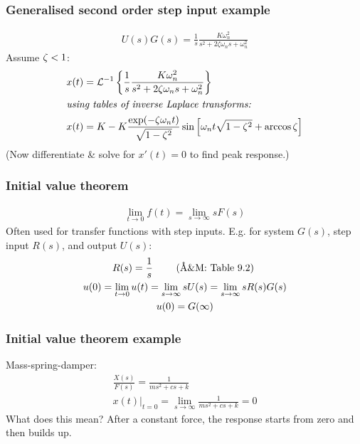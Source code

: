 \documentclass[10pt]{beamer-control}
\begin{document}
\begin{frame}
  \frametitle{Generalised second order step input example}

  \begin{gather}
    U(s) G(s) = \frac{1}{s}\frac{K\omega_n^2}{s^2+2\zeta\omega_ns+\omega_n^2}
  \end{gather}
  Assume $\zeta<1$:
  \begin{align}
    x(t) &= \mathcal{L}^{-1}\left\{ \frac{1}{s}\frac{K\omega_n^2}{s^2+2\zeta\omega_n s+\omega_n^2} \right\} \\
    \intertext{\em using tables of inverse Laplace transforms:}
    x(t) &= K - K\frac{\exp(-\zeta\omega_n t)}{\sqrt{1-\zeta^2}}\sin\left[\omega_n t\sqrt{1-\zeta^2}+\arccos\zeta\right] \label{eq:xt2o}
  \end{align}
  (Now differentiate \& solve for $x'(t)=0$ to find peak response.)

\end{frame}


\begin{frame}
  \frametitle{Initial value theorem}

  \begin{gather}
    \lim_{t\to0} f(t) = \lim_{s\to\infty} s F(s)
  \end{gather}
  Often used for transfer functions with step inputs. E.g. for system $G(s)$, step input $R(s)$, and output $U(s)$:
  \begin{gather}
    R(s) = \frac{1}{s} \qquad\text{\AMref{Table 9.2}}\\
    u(0) = \lim_{t\to0} u(t) = \lim_{s\to\infty} s U(s) = \lim_{s\to\infty} s R(s)G(s) \\
    u(0) = G(\infty)
  \end{gather}
\end{frame}

\begin{frame}
  \frametitle{Initial value theorem example}

  Mass-spring-damper:
  \begin{gather}
    \frac{X(s)}{F(s)} = \frac{1}{ms^2+cs+k} \\
    x(t)|_{t=0} = \lim_{s\to\infty} \frac{1}{ms^2+cs+k} = 0
  \end{gather}
  What does this mean? After a constant force, the response starts from zero and then builds up.

  \bigskip
\end{frame}
\end{document}
